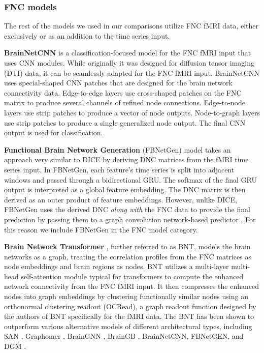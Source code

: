 \documentclass[final,5p,times,twocolumn,authoryear]{elsarticle}
\begin{document}
\subsubsection{FNC models}
The rest of the models we used in our comparisons utilize FNC fMRI data, either exclusively or as an addition to the time series input.

\noindent \textbf{BrainNetCNN} \citep{brainnetcnn} is a classification-focused model for the FNC fMRI input that uses CNN modules. While originally it was designed for diffusion tensor imaging (DTI) data, it can be seamlessly  adapted for the FNC fMRI input. BrainNetCNN uses special-shaped CNN patches that are designed for the brain network connectivity data. Edge-to-edge layers use cross-shaped patches on the FNC matrix to produce several channels of refined node connections. Edge-to-node layers use strip patches to produce a vector of node outputs. Node-to-graph layers use strip patches to produce a single generalized node output. The final CNN output is used for classification.

\noindent \textbf{Functional Brain Network Generation} (FBNetGen) model \citep{fbnetgen} takes an approach very similar to DICE by deriving DNC matrices from the fMRI time series input. In FBNetGen, each feature's time series is split into adjacent windows and passed through a bidirectional GRU. The softmax of the final GRU output is interpreted as a global feature embedding. The DNC matrix is then derived as an outer product of feature embeddings. However, unlike DICE, FBNetGen uses the derived DNC \emph{along with} the FNC data to provide the final prediction by passing them to a graph convolution network-based predictor \citep{GCN}. For this reason we include FBNetGen in the FNC model category.

\noindent \textbf{Brain Network Transformer} \citep{bnt}, further referred to as BNT, models the brain networks as a graph, treating the correlation profiles from the FNC matrices as node embeddings and brain regions as nodes. BNT utilizes a multi-layer multi-head self-attention module typical for transformers \citep{attention} to compute the enhanced network connectivity from the FNC fMRI input. It then compresses the enhanced nodes into graph embeddings by clustering functionally similar nodes using an orthonormal clustering readout (OCRead), a graph readout function designed by the authors of BNT specifically for the fMRI data. The BNT has been shown to outperform various alternative models of different architectural types, including SAN \citep{SAN}, Graphomer \citep{Graphomer}, BrainGNN \citep{BrainGNN}, BrainGB \citep{BrainGB}, BrainNetCNN, FBNetGEN, and DGM \citep{DGM}.
\end{document}

